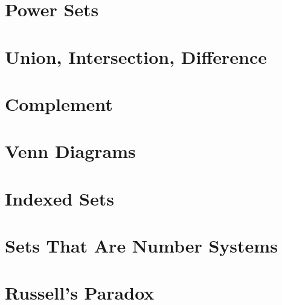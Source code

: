\documentclass[10pt]{article}
\theoremstyle{definition}
\begin{document}
    \section{Power Sets}

    \section{Union, Intersection, Difference}

    \section{Complement}

    \section{Venn Diagrams}

    \section{Indexed Sets}

    \section{Sets That Are Number Systems}

    \section{Russell's Paradox}

    
\end{document}
